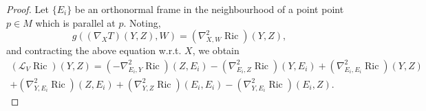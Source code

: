 \documentclass{amsart}
\newcommand{\lie}[1]{\mathcal{L}_{#1}}
\DeclareMathOperator*{\ricci}{Ric}
\theoremstyle{plain}
\theoremstyle{plain}
\theoremstyle{plain}
\theoremstyle{plain}
\theoremstyle{remark}
\begin{document}
\begin{proof}
Let $\{E_i\}$ be an orthonormal frame in the neighbourhood of a point point $p\in M$ which is parallel at $p$. 
Noting,
\begin{equation*}
    g( (\nabla_X T)(Y,Z) , W ) = (\nabla^2_{X,W} \ricci) (Y,Z),
\end{equation*}
and contracting the above equation w.r.t. $X$, we obtain
\begin{multline}\label{eqn: Lie V of Ricci}
	(\lie{V}\ricci)(Y,Z) = \left( -\nabla^2_{E_i, Y}  \ricci \right) (Z, E_i) - \left( \nabla^2_{E_i, Z} \ricci \right) (Y , E_i) + \left( \nabla^2_{E_i, E_i}  \ricci \right) ( Y, Z)  \\
		+ \left( \nabla^2_{Y, E_i} \ricci\right)  (Z, E_i) + \left( \nabla^2_{Y, Z} \ricci \right) (E_i, E_i) - \left( \nabla^2_{Y, E_i} \ricci \right) (E_i, Z)  .
\end{multline}


\end{proof}
\end{document}
